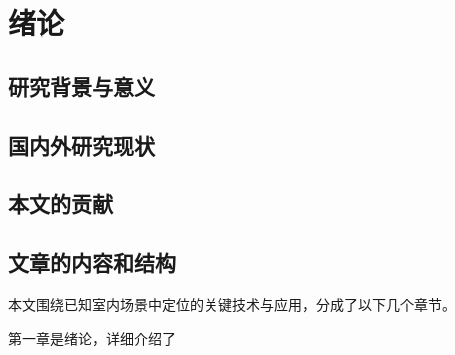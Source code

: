 \chapter{绪论}
\section{研究背景与意义}

\section{国内外研究现状}
\section{本文的贡献}
\section{文章的内容和结构}
本文围绕已知室内场景中定位的关键技术与应用，分成了以下几个章节。

第一章是绪论，详细介绍了
